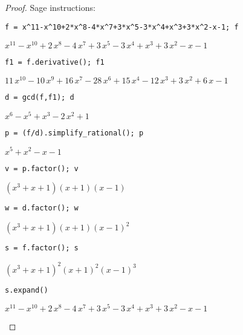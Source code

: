 \documentclass[11pt,a4paper]{article}
\begin{document}
\begin{proof}
 Sage instructions:

\begin{verbatim}
f = x^11-x^10+2*x^8-4*x^7+3*x^5-3*x^4+x^3+3*x^2-x-1; f
\end{verbatim}
\begin{center}     	
$x^{11} - x^{10} + 2 \, x^{8} - 4 \, x^{7} + 3 \, x^{5} - 3 \, x^{4} + x^{3} + 3 \, x^{2} - x - 1$
\end{center}

\begin{verbatim}
f1 = f.derivative(); f1
\end{verbatim}
\begin{center}     	
$11 \, x^{10} - 10 \, x^{9} + 16 \, x^{7} - 28 \, x^{6} + 15 \, x^{4} -12 \, x^{3} + 3 \, x^{2} + 6 \, x - 1$
\end{center}

\begin{verbatim}
d = gcd(f,f1); d
\end{verbatim}
\begin{center}     	
$x^{6} - x^{5} + x^{3} - 2 \, x^{2} + 1$
\end{center}

\begin{verbatim}
p = (f/d).simplify_rational(); p
\end{verbatim}
\begin{center}     	
$x^{5} + x^{2} - x - 1$
\end{center}

\begin{verbatim}
v = p.factor(); v
\end{verbatim}
\begin{center}     	
${\left(x^{3} + x + 1\right)} {\left(x + 1\right)} {\left(x - 1\right)}$
\end{center}

\begin{verbatim}
w = d.factor(); w
\end{verbatim}
\begin{center}     	
${\left(x^{3} + x + 1\right)} {\left(x + 1\right)} {\left(x -
1\right)}^{2}$
\end{center}

\begin{verbatim}
s = f.factor(); s
\end{verbatim}
\begin{center}     	
${\left(x^{3} + x + 1\right)}^{2} {\left(x + 1\right)}^{2} {\left(x -1\right)}^{3}$
\end{center}
\begin{verbatim}
s.expand()
\end{verbatim}
\begin{center} 
$x^{11} - x^{10} + 2 \, x^{8} - 4 \, x^{7} + 3 \, x^{5} - 3 \, x^{4} + x^{3} + 3 \, x^{2} - x - 1$
\end{center}

\end{proof}
\end{document}

